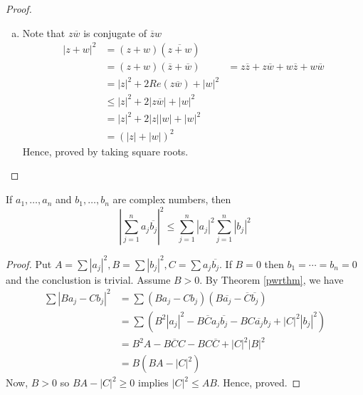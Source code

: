 \begin{thm}
\begin{proof}
\begin{enumerate}[a)]
            \item Note that $z \overline{w}$ is conjugate of $\overline{z} w$
            \begin{align*}
                |z + w|^2 & = (z + w)(\overline{z + w}) \\
                        & = (z + w)(\overline{z} + \overline{w})
                        & = z \overline{z} + z \overline{w} + w \overline{z} + w \overline{w} \\
                        & = |z|^2 + 2 Re(z \overline{w}) + |w|^2 \\
                        & \leq |z|^2 + 2 |z \overline{w}| + |w|^2 \\
                        & = |z|^2 + 2|z||w| + |w|^2 \\
                        & = (|z| + |w|)^2
            \end{align*}
            Hence, proved by taking square roots.
        \end{enumerate}
    \end{proof}
\end{thm}


\begin{thm}
    If $a_1, \dots, a_n$ and $b_1, \dots, b_n$ are complex numbers, then 
    $$
        \left| \sum_{j=1}^n a_j \overline{b_j} \right| ^ 2
        \leq 
        \sum_{j=1}^n |a_j|^2 \sum_{j=1}^n |b_j|^2
    $$
    \begin{proof}
        Put $A = \sum |a_j|^2, B = \sum |b_j|^2, C = \sum a_j \overline{b_j}$.
        If $B = 0$ then $b_1 = \cdots = b_n = 0$ and the conclustion is trivial.
        Assume $B > 0$. By Theorem \ref{pwrthm}, we have 
        \begin{align*}
            \sum |B a_j - C b_j|^2 
                & = \sum (B a_j - C b_j)(B \overline{a_j} - \overline{C} \overline{b_j}) \\
                & = \sum ( B^2 |a_j|^2 
                    - B \overline{C} a_j \overline{b_j} 
                    - B C \overline{a_j} b_j
                    + |C|^2 |b_j|^2 ) \\
                & = B^2 A - B \overline{C} C - B C \overline{C} + |C|^2 |B|^2 \\
                & = B (BA - |C|^2)
        \end{align*}
        Now, $B > 0$ so $BA - |C|^2 \geq 0$ implies $|C|^2 \leq AB$.
        Hence, proved.
    \end{proof}
\end{thm}